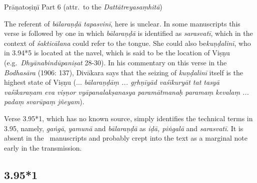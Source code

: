 \begin{ekdosis}
\begin{testimonia}[hp03_095]

Prāṇatoṣiṇī Part 6 (attr.~to the \emph{Dattātreyasaṃhitā})
\begin{versinnote}
\end{versinnote}


\end{testimonia}

\begin{philcomm}[hp03_095]
The referent of \emph{bālaraṇḍā tapasvinī}, here is unclear. In some manuscripts this verse is followed by one in which \emph{bālaraṇḍā} is identified as \emph{sarasvatī}, which in the context of \emph{śakticālana} could refer to the tongue. She could also be\emph{kuṇḍalinī}, who in 3.94*5 is located at the navel, which is said to be the location of Viṣṇu (e.g.~\emph{Dhyāna\-bindū\-paniṣat} 28-30). In his commentary on this verse in the \emph{Bodhasāra} (1906: 137), Divākara says that the seizing of \emph{kuṇḍalinī} itself is the highest state of Viṣṇu (... \emph{bālaraṇḍāṃ ... gṛhṇīyād vaśīkuryāt tat tasyā vaśīkaraṇam eva viṣṇor vyāpana\-lakṣa\-nasya paramā\-tmanaḥ paramaṃ kevalaṃ ... padaṃ svarūpaṃ jñeyam}).

Verse 3.95*1, which has no known source, simply identifies the technical terms in 3.95, namely, \emph{gaṅgā}, \emph{yamunā} and \emph{bālaraṇḍā} as \emph{iḍā, piṅgalā} and \emph{sarasvatī}. It is absent in the \textalpha\ manuscripts and probably crept into the text as a marginal note early in the transmission. 
\end{philcomm}

\subsection*{3.95*1}


\end{ekdosis}

